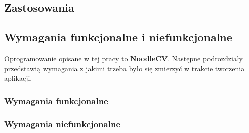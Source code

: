 \subsection{Zastosowania}

\subsection{Wymagania funkcjonalne i niefunkcjonalne}
Oprogramowanie opisane w tej pracy to \textbf{NoodleCV}. Następne podrozdziały przedstawią wymagania z jakimi trzeba było się zmierzyć w trakcie tworzenia aplikacji.
\subsubsection{Wymagania funkcjonalne}

\subsubsection{Wymagania niefunkcjonalne}
